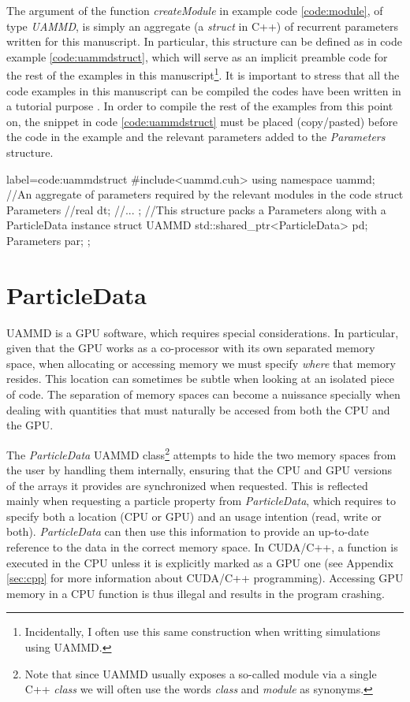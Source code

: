 \documentclass[ twoside,openright,titlepage,numbers=noenddot,%
headinclude,footinclude,cleardoublepage=empty,abstract=on,
BCOR=5mm,paper=a4,fontsize=11pt, dvipsnames
]{scrreprt}
\newcommand{\uammd}{\gls{UAMMD}\xspace}
\newcommand{\gpu}{\gls{GPU}\xspace}
\begin{document}
The argument of the function \emph{createModule} in example code \ref{code:module}, of type \emph{UAMMD}, is simply an aggregate (a \emph{struct} in C++) of recurrent parameters written for this manuscript. In particular, this structure can be defined as in code example \ref{code:uammdstruct}, which will serve as an implicit preamble code for the rest of the examples in this manuscript\footnote{Incidentally, I often use this same construction when writting simulations using \uammd.}. It is important to stress that all the code examples in this manuscript can be compiled     the codes have been written in a tutorial purpose . In order to compile the rest of the examples from this point on, the snippet in code \ref{code:uammdstruct} must be placed (copy/pasted) before the code in the example and the relevant parameters added to the \emph{Parameters} structure.

\begin{code2}
  {label=code:uammdstruct}
#include<uammd.cuh>
using namespace uammd; 
//An aggregate of parameters required by the relevant modules in the code
struct Parameters{
  //real dt;
  //...
};
//This structure packs a Parameters along with a ParticleData instance
struct UAMMD{
  std::shared_ptr<ParticleData> pd;
  Parameters par;
};
\end{code2}

\section{ParticleData}\label{sec:particledata}
\uammd is a \gpu software, which requires special considerations. In particular, given that the \gpu works as a co-processor with its own separated memory space, when allocating or accessing memory we must specify \emph{where} that memory resides. This location can sometimes be subtle when looking at an isolated piece of code. The separation of memory spaces can become a nuissance specially when dealing with quantities that must naturally be accesed from both the CPU and the \gpu.

The \emph{ParticleData} \uammd class\footnote{Note that since \uammd usually exposes a so-called module via a single C++ \emph{class} we will often use the words \emph{class} and \emph{module} as synonyms.} attempts to hide the two memory spaces from the user by handling them internally, ensuring that the CPU and \gpu versions of the arrays it provides are synchronized when requested. This is reflected mainly when requesting a particle property from \emph{ParticleData}, which requires to specify both a location (CPU or \gpu) and an usage intention (read, write or both). \emph{ParticleData} can then use this information to provide an up-to-date reference to the data in the correct memory space.
In CUDA/C++, a function is executed in the CPU unless it is explicitly marked as a \gpu one (see Appendix \ref{sec:cpp} for more information about CUDA/C++ programming). Accessing \gpu memory in a CPU function is thus illegal and results in the program crashing.
\end{document}
